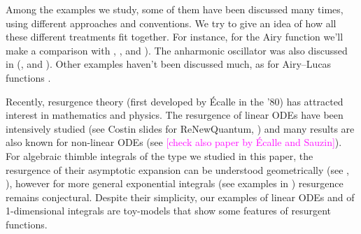 \documentclass{article}
\theoremstyle{definition}
\theoremstyle{plain}
\begin{document}
Among the examples we study, some of them have been discussed many times, using different approaches and conventions. We try to give an idea of how all these different treatments fit together. For instance, for the Airy function we’ll make a comparison with \cite[Section 2.2]{lectures-Marino}, \cite[Section 6.14]{diverg-resurg-i}, and \cite[Section 2.2]{kawai-takei}). The anharmonic oscillator was also discussed in (\cite{bender-wu}, \cite[Appendix B]{aniceto2019primer} and \cite[Section 2.5.3]{sternin1995borel}). Other examples haven't been discussed much, as for Airy--Lucas functions \cite[Equation 3.2]{charbonnier22}. 

Recently, resurgence theory (first developed by \'Ecalle in the '80) has attracted interest in mathematics and physics. The resurgence of linear ODEs have been intensively studied (see Costin slides for ReNewQuantum, \cite{EcalleIII,loday1994stokes,diverg-resurg--ii}) and many results are also known for non-linear ODEs (see \cite{schiappa-PI,costin-PI,diverg-resurg-iii} \textcolor{magenta}{[check also paper by \'Ecalle and Sauzin]}). For algebraic thimble integrals of the type we studied in this paper, the resurgence of their asymptotic expansion can be understood geometrically (see \cite{Maxim_slide_ERC}, \cite[Section 6.2]{kontsevich2022analyticity}), however for more general exponential integrals (see examples in \cite{Maxim_slide_ERC}) resurgence remains conjectural. Despite their simplicity, our examples of linear ODEs and of 1-dimensional integrals are toy-models that show some features of resurgent functions. 
\end{document}
